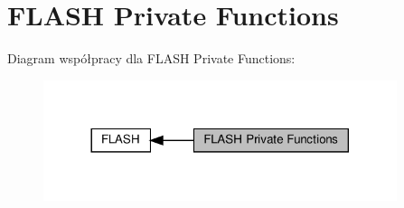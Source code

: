 \hypertarget{group___f_l_a_s_h___private___functions}{}\section{F\+L\+A\+SH Private Functions}
\label{group___f_l_a_s_h___private___functions}
Diagram współpracy dla F\+L\+A\+SH Private Functions\+:\nopagebreak
\begin{figure}[H]
\begin{center}
\leavevmode
\includegraphics[width=293pt]{group___f_l_a_s_h___private___functions}
\end{center}
\end{figure}
